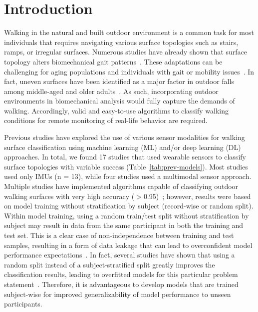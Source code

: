 \documentclass[sensors,article,accept,pdftex,moreauthors]{Definitions/mdpi}
\begin{document}
\section{Introduction}
\label{sec:introduction}

Walking in the natural and built outdoor environment is a common task for most individuals that requires navigating various surface topologies such as stairs, ramps, or irregular surfaces.  
{Numerous studies have already shown that surface topology alters biomechanical gait patterns~\cite{blair2018magnitude, allet2009gait, ippersiel_impact_2022, Dixon_2018, vieira_gait_2017, menz_acceleration_2003, emmerzaal_non-linear_2025, menant2009effects}}.
These adaptations can be challenging for aging populations and individuals with gait or mobility issues~\cite{allet2009gait, menant2009effects}. In fact, uneven surfaces have been identified as a major factor in outdoor falls among middle-aged and older adults~\cite{li_2006}. 
As such, incorporat{ing} outdoor environments in biomechanical analysis would fully capture the demands of walking. Accordingly, valid and easy-to-use algorithms to classify walking conditions for remote monitoring of real-life behavior are required.

Previous studies have explored the use of various sensor modalities for walking surface classification using machine learning (ML) and/or deep learning (DL) approaches. \textcolor{revision}{In total, we found 17 studies that used wearable sensors to classify surface topologies with variable success (Table~\ref{tab:prev-models}). Most studies used only IMUs (n = 13), while four studies used a multimodal sensor approach.}
Multiple studies have implemented algorithms capable of classifying outdoor walking surfaces with very high accuracy ($>$0.95)~\cite{Shah_2022, chauhan2025classifying, yildiz2023towards, Hu_2021, worsey2021automatic, camargo2021machine, kim2021classification, shin2021locomotion, seo2025gait}\textcolor{revision}{; however, results were based on model training without stratification by subject (record-wise or random split). 
Within model training, using a random train/test split without stratification by subject may result in data from the same participant in both the training and test set. {This is a clear case of non-independence between training and test samples, resulting in a form of data leakage that can lead to overconfident model performance expectations~\cite{kapoor2023leakage}.} {In fact,} several studies have shown that using {a random split instead of a subject-stratified split} greatly improves the classification results, {leading to overfitted models for this particular problem statement~\cite{Shah_2022,  Saeb2017, worsey2021automatic}. Therefore,} it is advantageous to develop models that are trained subject-wise for improved generalizability of model performance to unseen participants.}
\end{document}
